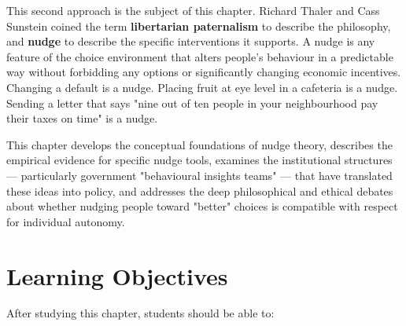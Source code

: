 \documentclass[12pt, letterpaper]{article}
\begin{document}
This second approach is the subject of this chapter. Richard Thaler and Cass Sunstein coined the term \textbf{libertarian paternalism} to describe the philosophy, and \textbf{nudge} to describe the specific interventions it supports. A nudge is any feature of the choice environment that alters people's behaviour in a predictable way without forbidding any options or significantly changing economic incentives. Changing a default is a nudge. Placing fruit at eye level in a cafeteria is a nudge. Sending a letter that says "nine out of ten people in your neighbourhood pay their taxes on time" is a nudge.

This chapter develops the conceptual foundations of nudge theory, describes the empirical evidence for specific nudge tools, examines the institutional structures --- particularly government "behavioural insights teams" --- that have translated these ideas into policy, and addresses the deep philosophical and ethical debates about whether nudging people toward "better" choices is compatible with respect for individual autonomy.

\medskip


\section*{Learning Objectives}


After studying this chapter, students should be able to:
\end{document}

